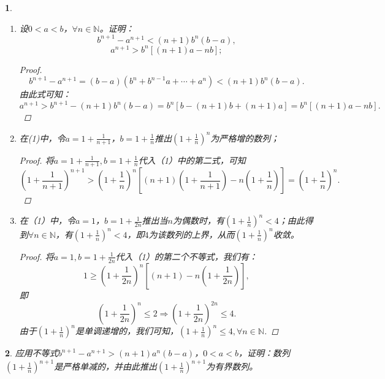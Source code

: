 \documentclass[utf8]{book}
\newtheorem{example}{}[section]             %
\begin{document}
\begin{example}
\renewcommand\labelenumi{\normalfont(\theenumi)}
\begin{enumerate}
\item 设$0<a<b$，$\forall n\in\mathbb{N}$。证明：
$$b^{n+1}-a^{n+1}< (n+1)b^n(b-a),$$
$$a^{n+1}>b^n\left[(n+1)a-nb\right];$$
\begin{proof}
$$b^{n+1}-a^{n+1}=(b-a)(b^{n}+b^{n-1}a+\cdots+a^n) < (n+1)b^n(b-a).$$
由此式可知：
$$a^{n+1} > b^{n+1}-(n+1)b^n(b-a) = b^n\left[b-(n+1)b +(n+1)a\right] = b^n\left[(n+1)a -nb\right].$$
\end{proof}
\item 在(1)中，令$a=1+\frac{1}{n+1}$，$b=1+\frac{1}{n}$推出$\left(1+\frac{1}{n}\right)^n$为严格增的数列；
\begin{proof}
将$a=1+\frac{1}{n+1}, b = 1+\frac{1}{n}$代入（1）中的第二式，可知 
$$\left(1+\frac{1}{n+1}\right)^{n+1} > \left(1+\frac{1}{n}\right)^n\left[(n+1)\left(1+\frac{1}{n+1}\right)
-n\left(1+\frac{1}{n}\right)\right]=\left(1+\frac{1}{n}\right)^n.$$
\end{proof}
\item 在（1）中，令$a=1$，$b=1+\frac{1}{2n}$推出当$n$为偶数时，有$\left(1+\frac{1}{n}\right)^n<4$；由此得到$\forall n\in\mathbb{N}$，有$\left(1+\frac{1}{n}\right)^n<4$，即$4$为该数列的上界，从而$\left(1+\frac{1}{n}\right)^n$收敛。
\begin{proof}
将$a=1, b=1+\frac{1}{2n}$代入（1）的第二个不等式，我们有：
$$1\geq \left(1+\frac{1}{2n}\right)^n\left[(n+1) - n\left(1+\frac{1}{2n}\right)\right],$$
即
$$\left(1+\frac{1}{2n}\right)^n \leq 2\Rightarrow \left(1+\frac{1}{2n}\right)^{2n} \leq 4.$$
由于$\left(1+\frac{1}{n}\right)^n$是单调递增的，我们可知，$\left(1+\frac{1}{n}\right)^{n} \leq 4, \forall n\in\mathbb{N}$.
\end{proof}
\end{enumerate}
\end{example}
\begin{example}
应用不等式$b^{n+1}-a^{n+1}>(n+1)a^n(b-a)$，$0<a<b$，证明：数列$\left(1+\frac{1}{n}\right)^{n+1}$是严格单减的，并由此推出$\left(1+\frac{1}{n}\right)^{n+1}$为有界数列。
\end{example}
\end{document}
